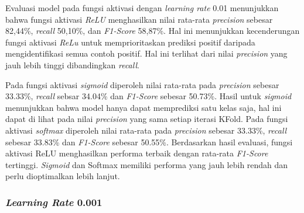       Evaluasi model pada fungsi aktivasi dengan \textit{learning rate} 0.01 menunjukkan bahwa fungsi aktivasi \textit{ReLU} menghasilkan nilai rata-rata \textit{precision} sebesar 82,44\%, \textit{recall} 50,10\%, dan\textit{ F1-Score} 58,87\%. Hal ini menunjukkan kecenderungan fungsi aktivasi \textit{ReLu} untuk memprioritaskan prediksi positif daripada mengidentifikasi semua contoh positif. Hal ini terlihat dari nilai \textit{precision} yang jauh lebih tinggi dibandingkan \textit{recall}.

     Pada fungsi aktivasi \textit{sigmoid} diperoleh nilai rata-rata pada \textit{precision} sebesar 33.33\%, \textit{recall} sebsar 34.04\% dan\textit{ F1-Score} sebesar 50.73\%. Hasil untuk \textit{sigmoid} menunjukkan bahwa model hanya dapat memprediksi satu kelas saja, hal ini dapat di lihat pada nilai \textit{precision} yang sama setiap iterasi KFold. Pada fungsi aktivasi \textit{softmax} diperoleh nilai rata-rata pada \textit{precision} sebesar 33.33\%, \textit{recall} sebesar 33.83\% dan \textit{F1-Score} sebesar 50.55\%.
     Berdasarkan hasil evaluasi, fungsi aktivasi ReLU menghasilkan performa terbaik dengan rata-rata \textit{F1-Score} tertinggi. \textit{Sigmoid} dan Softmax memiliki performa yang jauh lebih rendah dan perlu dioptimalkan lebih lanjut.


 

    \subsubsection{\textit{Learning Rate} 0.001}
    
